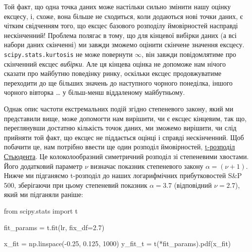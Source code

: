 \documentclass[
  letterpaper,
]{report}
\newenvironment{Shaded}{\begin{snugshade}}{\end{snugshade}}
\newcommand{\DecValTok}[1]{\textcolor[rgb]{0.68,0.00,0.00}{#1}}
\newcommand{\FloatTok}[1]{\textcolor[rgb]{0.68,0.00,0.00}{#1}}
\newcommand{\ImportTok}[1]{\textcolor[rgb]{0.00,0.46,0.62}{#1}}
\newcommand{\NormalTok}[1]{\textcolor[rgb]{0.00,0.23,0.31}{#1}}
\newcommand{\OperatorTok}[1]{\textcolor[rgb]{0.37,0.37,0.37}{#1}}
\begin{document}
Той факт, що одна точка даних може настільки сильно змінити нашу оцінку
ексцесу, і, схоже, вона більше не сходиться, коли додаються нові точки
даних, є чітким свідченням того, що ексцес базового розподілу
ймовірностей насправді нескінченний! Проблема полягає в тому, що для
кінцевої вибірки даних (а всі набори даних скінченні) ми завжди зможемо
оцінити скінчене значення ексцесу. \texttt{scipy.stats.kurtosis} не може
повернути \(\infty\), він завжди повідомлятиме про скінченний ексцес
\emph{вибірки}. Але ця кінцева оцінка не допоможе нам нічого сказати про
майбутню поведінку ринку, оскільки ексцес продовжуватиме переходити до
ще більших значень до наступного чорного понеділка, іншого чорного
вівторка \ldots{} у більш-менш віддаленому майбутньому.

Однак опис частоти екстремальних подій згідно степеневого закону, який
ми представили вище, може допомогти нам вирішити, чи є ексцес кінцевим,
так що, переглянувши достатню кількість точок даних, ми зможемо
вирішити, чи слід прийняти той факт, що ексцес не піддається оцінці і
справді нескінченний. Щоб побачити це, нам потрібно ввести ще один
розподіл ймовірностей,
\href{https://en.wikipedia.org/wiki/Student\%27s_t-distribution}{t-розподіл
Стьюдента}. Це колоколообразний симетричний розподіл зі степеневими
хвостами. Його додатковий параметр \(\nu\) визначає показник степеневого
закону \(\alpha=(\nu+1)\). Нижче ми підганяємо t-розподіл до наших
логарифмічних прибутковостей S\&P 500, зберігаючи при цьому степеневий
показник \(\alpha=3.7\) (відповідний \(\nu = 2.7\)), який ми підганяли
раніше:

\begin{Shaded}
\begin{Highlighting}[]
\ImportTok{from}\NormalTok{ scipy.stats }\ImportTok{import}\NormalTok{ t}

\NormalTok{fit\_params }\OperatorTok{=}\NormalTok{ t.fit(lr, fix\_df}\OperatorTok{=}\FloatTok{2.7}\NormalTok{)}

\NormalTok{x\_fit }\OperatorTok{=}\NormalTok{ np.linspace(}\OperatorTok{{-}}\FloatTok{0.25}\NormalTok{, }\FloatTok{0.125}\NormalTok{, }\DecValTok{1000}\NormalTok{)}
\NormalTok{y\_fit\_t }\OperatorTok{=}\NormalTok{ t(}\OperatorTok{*}\NormalTok{fit\_params).pdf(x\_fit)}
\end{Highlighting}
\end{Shaded}
\end{document}
